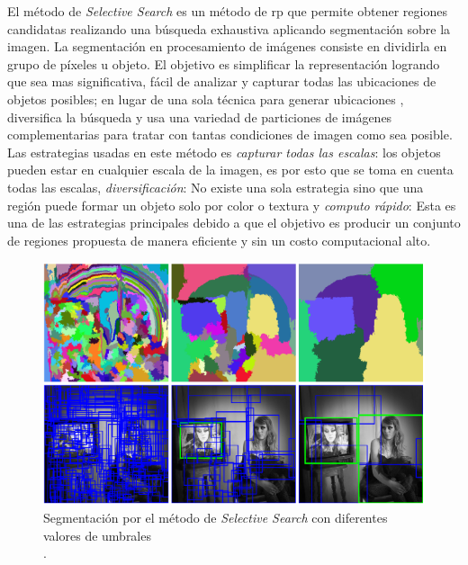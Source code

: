 
El método de \textit{Selective Search} \citep{selectivesearch} es un método de \ac{rp} que  permite obtener regiones candidatas realizando una búsqueda exhaustiva aplicando segmentación sobre la imagen. La segmentación  en procesamiento de imágenes consiste en dividirla en grupo de píxeles u objeto. El objetivo es simplificar la representación logrando que sea mas significativa, fácil de analizar y capturar todas las ubicaciones de objetos posibles; en lugar de una sola técnica para generar ubicaciones , diversifica la  búsqueda y usa  una variedad de particiones de imágenes complementarias para tratar con tantas condiciones de imagen como sea posible.
Las estrategias usadas en este método es \textit{capturar todas las escalas}: los objetos pueden estar en cualquier escala de la imagen, es por esto que se toma en cuenta todas las escalas, \textit{diversificación}: No existe una sola estrategia sino que una región puede formar un objeto solo por color o textura y \textit{computo rápido}: Esta es una de las estrategias principales debido a que el objetivo es producir un conjunto de regiones propuesta de manera eficiente y sin un costo computacional alto.

\begin{figure}[H]
 \centering
  \includegraphics[scale=0.4,keepaspectratio=true,clip=true]{imagenes/MarcoTeorico/selectivesearch.png}
  \caption{Segmentación por el método de \textit{Selective Search} con diferentes valores de umbrales \\ \citep{selectivesearch}.}
	\label{Fig: overlapping}
\end{figure}

